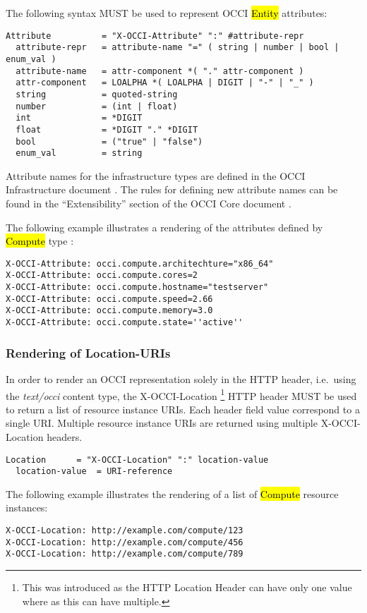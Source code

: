 \documentclass[10pt,a4paper]{article}
\begin{document}
The following syntax MUST be used to represent OCCI \hl{Entity}
attributes:

\begin{verbatim}
Attribute          = "X-OCCI-Attribute" ":" #attribute-repr
  attribute-repr   = attribute-name "=" ( string | number | bool | enum_val )
  attribute-name   = attr-component *( "." attr-component )
  attr-component   = LOALPHA *( LOALPHA | DIGIT | "-" | "_" )	
  string           = quoted-string
  number           = (int | float)
  int              = *DIGIT
  float            = *DIGIT "." *DIGIT
  bool             = ("true" | "false")
  enum_val         = string
\end{verbatim}

Attribute names for the infrastructure types are defined in the OCCI
Infrastructure document \cite{occi:infrastructure}.  The rules for
defining new attribute names can be found in the ``Extensibility''
section of the OCCI Core document \cite{occi:core}.

The following example illustrates a rendering of the attributes
defined by \hl{Compute} type \cite{occi:infrastructure}:

\begin{verbatim}
X-OCCI-Attribute: occi.compute.architechture="x86_64"
X-OCCI-Attribute: occi.compute.cores=2
X-OCCI-Attribute: occi.compute.hostname="testserver"
X-OCCI-Attribute: occi.compute.speed=2.66
X-OCCI-Attribute: occi.compute.memory=3.0
X-OCCI-Attribute: occi.compute.state=''active''
\end{verbatim}

\subsubsection{Rendering of Location-URIs}
In order to render an OCCI representation solely in the HTTP header,
i.e.~using the \textit{text/occi} content type, the X-OCCI-Location 
\footnote{This was introduced as the HTTP Location Header can have only one value
where as this can have multiple.}
HTTP header MUST be used to return a list of resource instance
URIs. Each header field value correspond to a single URI. Multiple
resource instance URIs are returned using multiple X-OCCI-Location
headers.

\begin{verbatim}
Location      = "X-OCCI-Location" ":" location-value
  location-value  = URI-reference
\end{verbatim}

The following example illustrates the rendering of a list of
\hl{Compute} resource instances:
\begin{verbatim}
X-OCCI-Location: http://example.com/compute/123
X-OCCI-Location: http://example.com/compute/456
X-OCCI-Location: http://example.com/compute/789
\end{verbatim}
\end{document}
